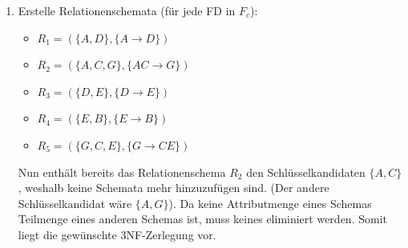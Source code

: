 \documentclass[11pt, a4paper]{article}
\begin{document}
\begin{enumerate}
\item Erstelle Relationenschemata (für jede FD in $F_c$):
\begin{itemize}
\item $R_1=(\{ A,D\},\{ A \rightarrow D\})$
\item $R_2=(\{ A,C,G\},\{ AC \rightarrow G\})$
\item $R_3=(\{ D,E\},\{ D \rightarrow E\})$
\item $R_4=(\{ E,B\},\{ E \rightarrow B\})$
\item $R_5=(\{ G,C,E\},\{ G \rightarrow CE\})$
\end{itemize}
Nun enthält bereits das Relationenschema $R_2$ den Schlüsselkandidaten $\{ A,C\}$, weshalb keine Schemata mehr hinzuzufügen sind. (Der andere Schlüsselkandidat wäre $\{ A,G\}$).
Da keine Attributmenge eines Schemas Teilmenge eines anderen Schemas ist, muss keines eliminiert werden. Somit liegt die gewünschte 3NF-Zerlegung vor.

\end{enumerate}
\end{document}
